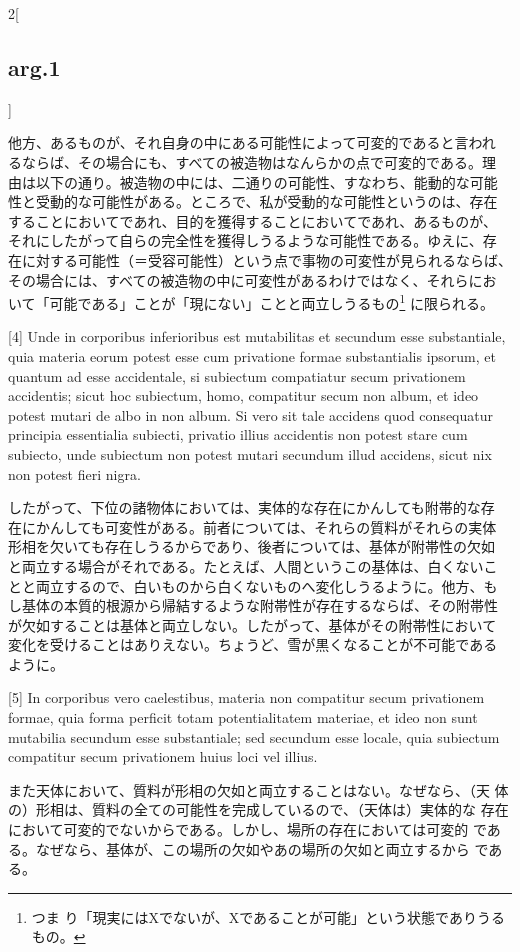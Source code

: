 \documentclass[paper=a4paper,fontsize=10pt,jafontsize=9pt,titlepage]{jlreq}
\begin{document}
\begin{paracol}{2}[\subsection{arg.1}]
\switchcolumn

他方、あるものが、それ自身の中にある可能性によって可変的であると言われ
るならば、その場合にも、すべての被造物はなんらかの点で可変的である。理
由は以下の通り。被造物の中には、二通りの可能性、すなわち、能動的な可能
性と受動的な可能性がある。ところで、私が受動的な可能性というのは、存在
することにおいてであれ、目的を獲得することにおいてであれ、あるものが、
それにしたがって自らの完全性を獲得しうるような可能性である。ゆえに、存
在に対する可能性（＝受容可能性）という点で事物の可変性が見られるならば、
その場合には、すべての被造物の中に可変性があるわけではなく、それらにお
いて「可能である」ことが「現にない」ことと両立しうるもの\footnote{つま
り「現実にはXでないが、Xであることが可能」という状態でありうるもの。}
に限られる。

\switchcolumn*

[4] Unde in corporibus inferioribus est mutabilitas et secundum esse
substantiale, quia materia eorum potest esse cum privatione formae
substantialis ipsorum, et quantum ad esse accidentale, si subiectum
compatiatur secum privationem accidentis; sicut hoc subiectum, homo,
compatitur secum non album, et ideo potest mutari de albo in non
album.  Si vero sit tale accidens quod consequatur principia
essentialia subiecti, privatio illius accidentis non potest stare cum
subiecto, unde subiectum non potest mutari secundum illud accidens,
sicut nix non potest fieri nigra.

\switchcolumn

したがって、下位の諸物体においては、実体的な存在にかんしても附帯的な存
在にかんしても可変性がある。前者については、それらの質料がそれらの実体
形相を欠いても存在しうるからであり、後者については、基体が附帯性の欠如
と両立する場合がそれである。たとえば、人間というこの基体は、白くないこ
とと両立するので、白いものから白くないものへ変化しうるように。他方、も
し基体の本質的根源から帰結するような附帯性が存在するならば、その附帯性
が欠如することは基体と両立しない。したがって、基体がその附帯性において
変化を受けることはありえない。ちょうど、雪が黒くなることが不可能である
ように。

\switchcolumn*

[5] In corporibus vero caelestibus, materia non compatitur secum
privationem formae, quia forma perficit totam potentialitatem
materiae, et ideo non sunt mutabilia secundum esse substantiale; sed
secundum esse locale, quia subiectum compatitur secum privationem
huius loci vel illius.

\switchcolumn

また天体において、質料が形相の欠如と両立することはない。なぜなら、（天
体の）形相は、質料の全ての可能性を完成しているので、（天体は）実体的な
存在において可変的でないからである。しかし、場所の存在においては可変的
である。なぜなら、基体が、この場所の欠如やあの場所の欠如と両立するから
である。


\end{paracol}
\end{document}
